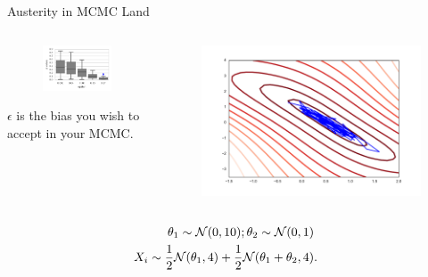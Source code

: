 \documentclass{beamer}
\begin{document}
  \begin{frame}{Austerity in MCMC Land}
\begin{columns}
        \begin{column}{.5\textwidth}
        \begin{figure}
           \includegraphics[width=\textwidth]{img/Heiko1} 
        \end{figure}
        $\epsilon$ is the bias you wish to accept in your MCMC. 
        \end{column}
        \begin{column}{.5\textwidth}
            \begin{figure}
           \includegraphics[width=\textwidth]{./img/sgld_trace_and_density.pdf} 
        \end{figure}
        \end{column}
    \end{columns}
 \begin{align*}
 \theta_{1}\sim{\cal N}(0,10);\theta_{2}\sim{\cal N}(0,1)\\
 X_{i}\sim\frac{1}{2}{\cal N}(\theta_{1},4)+\frac{1}{2}{\cal N}(\theta_{1}+\theta_{2},4) & .
\end{align*}
 \end{frame}
\end{document}

